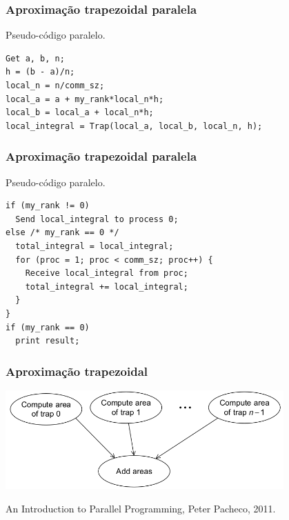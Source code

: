\documentclass[xcolor={usenames,dvipsnames},12pt,presentation,aspectratio=169]{beamer}
\begin{document}
\begin{frame}[fragile]
  \frametitle{Aproximação trapezoidal paralela}
  Pseudo-código paralelo.
\begin{center}
\begin{minipage}{0.95\textwidth}
  \begin{verbatim}
Get a, b, n;
h = (b - a)/n;
local_n = n/comm_sz;
local_a = a + my_rank*local_n*h;
local_b = local_a + local_n*h;
local_integral = Trap(local_a, local_b, local_n, h);
  \end{verbatim}
\end{minipage}
\end{center}
\end{frame}
\begin{frame}[fragile]
  \frametitle{Aproximação trapezoidal paralela}
  Pseudo-código paralelo.
\begin{center}
\begin{minipage}{0.95\textwidth}
  \begin{verbatim}
if (my_rank != 0)
  Send local_integral to process 0;
else /* my_rank == 0 */
  total_integral = local_integral;
  for (proc = 1; proc < comm_sz; proc++) {
    Receive local_integral from proc;
    total_integral += local_integral;
  }
}
if (my_rank == 0)
  print result;
  \end{verbatim}
\end{minipage}
\end{center}
\end{frame}
\begin{frame}
  \frametitle{Aproximação trapezoidal}
  \vspace{-5mm}
  \begin{center}
	\includegraphics[width=0.8\textwidth]{trap2.png}
  \end{center}
  \vspace{-4mm}
  {\tiny An Introduction to Parallel Programming, Peter Pacheco, 2011.}
\end{frame}
\end{document}
